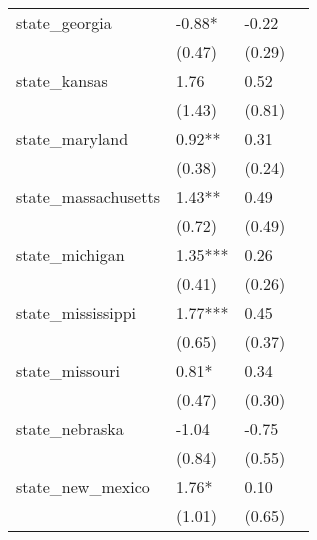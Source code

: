 \begin{table}
\begin{center}
\begin{tabular}{llll}
    state\_georgia                                 & -0.88*                 & -0.22        &                \\
                                                   & (0.47)                 & (0.29)       &                \\
    state\_kansas                                  & 1.76                   & 0.52         &                \\
                                                   & (1.43)                 & (0.81)       &                \\
    state\_maryland                                & 0.92**                 & 0.31         &                \\
                                                   & (0.38)                 & (0.24)       &                \\
    state\_massachusetts                           & 1.43**                 & 0.49         &                \\
                                                   & (0.72)                 & (0.49)       &                \\
    state\_michigan                                & 1.35***                & 0.26         &                \\
                                                   & (0.41)                 & (0.26)       &                \\
    state\_mississippi                             & 1.77***                & 0.45         &                \\
                                                   & (0.65)                 & (0.37)       &                \\
    state\_missouri                                & 0.81*                  & 0.34         &                \\
                                                   & (0.47)                 & (0.30)       &                \\
    state\_nebraska                                & -1.04                  & -0.75        &                \\
                                                   & (0.84)                 & (0.55)       &                \\
    state\_new\_mexico                             & 1.76*                  & 0.10         &                \\
                                                   & (1.01)                 & (0.65)       &                \\

\end{tabular}
\end{center}
\end{table}
